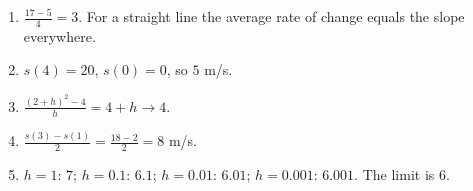 \begin{enumerate}[label=\textbf{\ansnum.\arabic*}]
  \item $\frac{17-5}{4}=3$. For a straight line the average rate of change equals the slope everywhere.
  \item $s(4)=20$, $s(0)=0$, so $5$ m/s.
  \item $\frac{(2+h)^2-4}{h}=4+h\to 4$.
  \item $\frac{s(3)-s(1)}{2}=\frac{18-2}{2}=8$ m/s.
  \item[\textbf{\ansnum.5}] $h=1$: $7$; $h=0.1$: $6.1$; $h=0.01$: $6.01$; $h=0.001$: $6.001$. The limit is $6$.
\end{enumerate}
